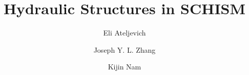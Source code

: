 \documentclass[11pt,twoside]{article}
\title{Hydraulic Structures in SCHISM}
\author{Eli Ateljevich}
\affil{California Department of Water Resources}
\author{Joseph Y. L. Zhang}
\affil{Virginia Institute of Marine Sciences}
\author{Kijin Nam}
\affil{California Department of Water Resources}
\begin{document}
\maketitle
\thispagestyle{empty}

\newcommand{\explain}[2]{\underset{\mathclap{\overset{\uparrow}{#2}}}{#1}}
\newcommand{\explainup}[2]{\overset{\mathclap{\underset{\downarrow}{#2}}}{#1}}



\tableofcontents




 
\printglossaries
\end{document}
